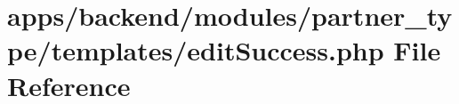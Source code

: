 \hypertarget{backend_2modules_2partner__type_2templates_2edit_success_8php}{\section{apps/backend/modules/partner\-\_\-type/templates/edit\-Success.php File Reference}
\label{backend_2modules_2partner__type_2templates_2edit_success_8php}
}
